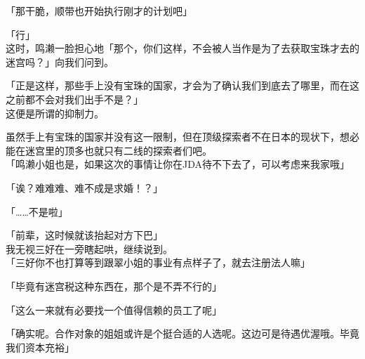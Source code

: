 「那干脆，顺带也开始执行刚才的计划吧」

「行」\\

这时，鸣濑一脸担心地「那个，你们这样，不会被人当作是为了去获取宝珠才去的迷宫吗？」向我们问到。

「正是这样，那些手上没有宝珠的国家，才会为了确认我们到底去了哪里，而在这之前都不会对我们出手不是？」\\

这便是所谓的抑制力。

虽然手上有宝珠的国家并没有这一限制，但在顶级探索者不在日本的现状下，想必能在迷宫里的顶多也就只有二线的探索者们吧。\\

「鸣濑小姐也是，如果这次的事情让你在JDA待不下去了，可以考虑来我家哦」

「诶？难难难、难不成是求婚！？」

「……不是啦」

「前辈，这时候就该抬起对方下巴」\\

我无视三好在一旁瞎起哄，继续说到。\\

「三好你不也打算等到跟翠小姐的事业有点样子了，就去注册法人嘛」

「毕竟有迷宫税这种东西在，那个是不弄不行的」

「这么一来就有必要找一个值得信赖的员工了呢」

「确实呢。合作对象的姐姐或许是个挺合适的人选呢。这边可是待遇优渥哦。毕竟我们资本充裕」


